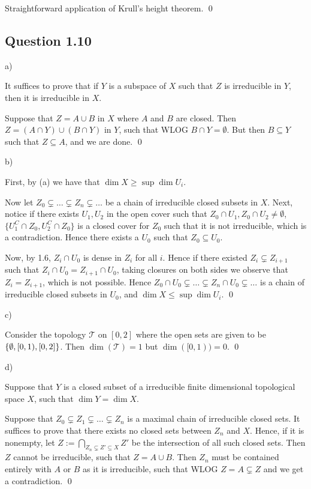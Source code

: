 \documentclass{article}
\begin{document}
Straightforward application of Krull’s height theorem. \qed

\newpage
\subsection*{Question 1.10}

\noindent a)

It suffices to prove that if $Y$ is a subspace of $X$ such that $Z$ is irreducible in $Y$, then it is irreducible in $X$.

Suppose that $Z = A \cup B$ in $X$ where $A$ and $B$ are closed. Then $Z = (A \cap Y) \cup (B \cap Y)$ in $Y$, such that WLOG $B \cap Y = \emptyset$. But then $B \subseteq Y$ such that $Z \subseteq A$, and we are done. \qed

\noindent b)

First, by (a) we have that $\dim X \geq \sup \dim U_i$.

Now let $Z_0 \subsetneq \dots \subsetneq Z_n \subsetneq \dots$ be a chain of irreducible closed subsets in $X$. Next, notice if there exists $U_1, U_2$ in the open cover such that $Z_0 \cap U_1, Z_0 \cap U_2 \neq \emptyset$, $\{U_1^C \cap Z_0, U_2^C \cap Z_0\}$ is a closed cover for $Z_0$ such that it is not irreducible, which is a contradiction. Hence there exists a $U_0$ such that $Z_0 \subseteq U_0$.

Now, by 1.6, $Z_i \cap U_0$ is dense in $Z_i$ for all $i$. Hence if there existed $Z_i \subsetneq Z_{i+1}$ such that $Z_i \cap U_0 = Z_{i+1} \cap U_0$, taking closures on both sides we observe that $Z_i = Z_{i+1}$, which is not possible. Hence $Z_0 \cap U_0 \subsetneq \dots \subsetneq Z_n \cap U_0 \subsetneq \dots$ is a chain of irreducible closed subsets in $U_0$, and $\dim X \leq \sup \dim U_i$. \qed

\noindent c)

Consider the topology $\mathcal T$ on $[0,2]$ where the open sets are given to be $\{\emptyset, [0,1), [0,2]\}$. Then $\dim(\mathcal T) = 1$ but $\dim([0,1)) = 0$. \qed

\noindent d)

Suppose that $Y$ is a closed subset of a irreducible finite dimensional topological space $X$, such that $\dim Y = \dim X$.

Suppose that $Z_0 \subsetneq Z_1 \subsetneq \dots \subsetneq Z_n$ is a maximal chain of irreducible closed sets. It suffices to prove that there exists no closed sets between $Z_n$ and $X$. Hence, if it is nonempty, let $Z := \bigcap_{Z_n \subsetneq Z' \subseteq X}Z'$ be the intersection of all such closed sets. Then $Z$ cannot be irreducible, such that $Z = A \cup B$. Then $Z_n$ must be contained entirely with $A$ or $B$ as it is irreducible, such that WLOG $Z = A \subsetneq Z$ and we get a contradiction. \qed
\end{document}
